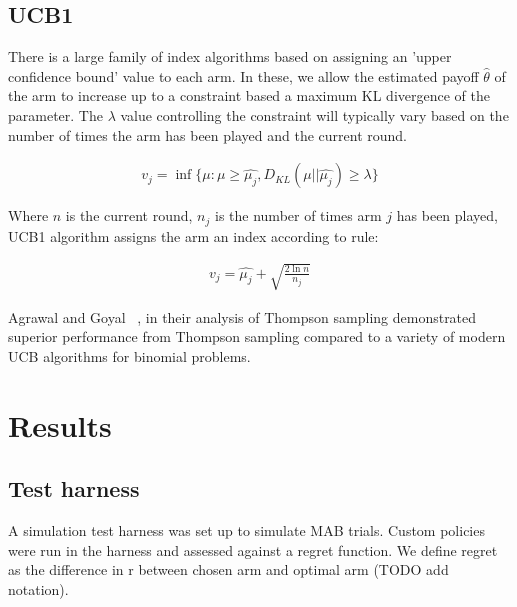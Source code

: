 \documentclass[11pt,a4,singlespacing,titlepagenumber=on]{scrreprt}
\numberwithin{equation}{chapter} %
\theoremstyle{remark}
\begin{document}
\section{ UCB1 }

There is a large family of index algorithms based on assigning an 'upper confidence bound' value to each arm. In these, we allow the estimated payoff $\hat{\theta}$ of the arm to increase up to a constraint based a maximum KL divergence of the parameter. The $\lambda$ value controlling the constraint will typically vary based on the number of times the arm has been played and the current round.

\begin{align}
v_j = \inf\{ \mu : \mu \geq \hat{\mu_j}, D_{KL}(\mu||\hat{\mu_j}) \geq \lambda\} 
\end{align}

Where $n$ is the current round, $n_j$ is the number of times arm $j$ has been played, UCB1 algorithm assigns the arm an index according to rule:

\begin{align}
v_j = \hat{\mu_j} + \sqrt{ \frac{2 \ln{n}}{n_j}  }
\end{align}

Agrawal and Goyal ~\cite{DBLP:journals/corr/abs-1111-1797}, in their analysis of Thompson sampling demonstrated superior performance from Thompson sampling compared to a variety of modern UCB algorithms for binomial problems.

\chapter{ Results }

\section{Test harness}

A simulation test harness was set up to simulate MAB trials. Custom policies were run in the harness and assessed against a regret function. We define regret as the difference in r between chosen arm and optimal arm (TODO add notation).
\end{document}

